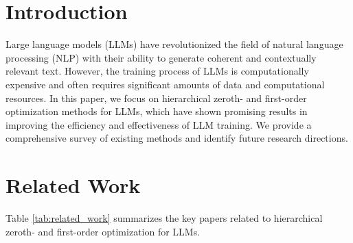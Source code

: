 \documentclass{article}
\begin{document}
\section{Introduction}
Large language models (LLMs) have revolutionized the field of natural language processing (NLP) with their ability to generate coherent and contextually relevant text. However, the training process of LLMs is computationally expensive and often requires significant amounts of data and computational resources. In this paper, we focus on hierarchical zeroth- and first-order optimization methods for LLMs, which have shown promising results in improving the efficiency and effectiveness of LLM training. We provide a comprehensive survey of existing methods and identify future research directions.

\section{Related Work}
Table \ref{tab:related_work} summarizes the key papers related to hierarchical zeroth- and first-order optimization for LLMs.
\end{document}

